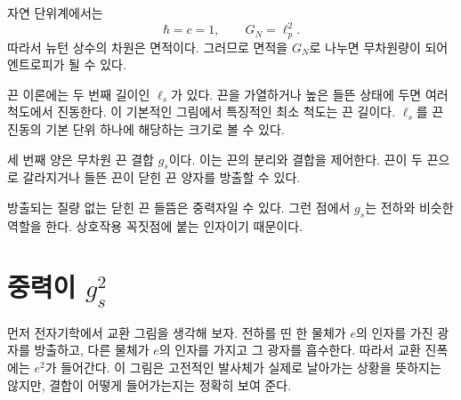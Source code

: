 \begin{classroomqa}
\end{classroomqa}

자연 단위계에서는
\begin{equation}
\hbar=c=1,
\qquad
G_N=\ell_p^2.
\label{eq:l06-planck-area}
\end{equation}
따라서 뉴턴 상수의 차원은 면적이다. 그러므로 면적을 \(G_N\)로 나누면 무차원량이 되어 엔트로피가 될 수 있다.

끈 이론에는 두 번째 길이인 \(\ell_s\)가 있다. 끈을 가열하거나 높은 들뜬 상태에 두면 여러 척도에서 진동한다. 이 기본적인 그림에서 특징적인 최소 척도는 끈 길이다. \(\ell_s\)를 끈 진동의 기본 단위 하나에 해당하는 크기로 볼 수 있다.

세 번째 양은 무차원 끈 결합 \(g_s\)이다. 이는 끈의 분리와 결합을 제어한다. 끈이 두 끈으로 갈라지거나 들뜬 끈이 닫힌 끈 양자를 방출할 수 있다.

\begin{classroomqa}
\end{classroomqa}

방출되는 질량 없는 닫힌 끈 들뜸은 중력자일 수 있다. 그런 점에서 \(g_s\)는 전하와 비슷한 역할을 한다. 상호작용 꼭짓점에 붙는 인자이기 때문이다.

\section{중력이 \texorpdfstring{\(g_s^2\)}{결합의 제곱을 아는 이유}}

먼저 전자기학에서 교환 그림을 생각해 보자. 전하를 띤 한 물체가 \(e\)의 인자를 가진 광자를 방출하고, 다른 물체가 \(e\)의 인자를 가지고 그 광자를 흡수한다. 따라서 교환 진폭에는 \(e^2\)가 들어간다. 이 그림은 고전적인 발사체가 실제로 날아가는 상황을 뜻하지는 않지만, 결합이 어떻게 들어가는지는 정확히 보여 준다.

